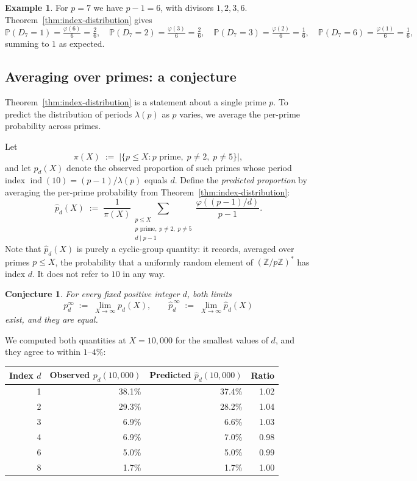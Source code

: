 \documentclass[12pt]{amsart}
\newtheorem{conjecture}[theorem]{Conjecture}
\theoremstyle{definition}
\newtheorem{example}[theorem]{Example}
\theoremstyle{remark}
\newcommand{\Z}{\mathbb{Z}}
\newcommand{\ind}{\operatorname{ind}}
\begin{document}
\begin{example}\label{ex:p-7-distribution}
For $p = 7$ we have $p - 1 = 6$, with divisors $1, 2, 3, 6$.
Theorem~\ref{thm:index-distribution} gives
\[
    \mathbb{P}(D_7 = 1) = \tfrac{\varphi(6)}{6} = \tfrac{2}{6}, \quad
    \mathbb{P}(D_7 = 2) = \tfrac{\varphi(3)}{6} = \tfrac{2}{6}, \quad
    \mathbb{P}(D_7 = 3) = \tfrac{\varphi(2)}{6} = \tfrac{1}{6}, \quad
    \mathbb{P}(D_7 = 6) = \tfrac{\varphi(1)}{6} = \tfrac{1}{6},
\]
summing to $1$ as expected.
\end{example}

\subsection{Averaging over primes: a conjecture}\label{subsec:averaging}

Theorem~\ref{thm:index-distribution} is a statement about a single prime
$p$. To predict the distribution of periods $\lambda(p)$ as $p$ varies,
we average the per-prime probability across primes.

Let
\[
    \pi(X) \;:=\; |\{p \le X : p \text{ prime},\; p \neq 2,\; p \neq 5\}|,
\]
and let $p_d(X)$ denote the observed proportion of such primes whose
period index $\ind(10) = (p-1)/\lambda(p)$ equals $d$. Define the
\emph{predicted proportion} by averaging the per-prime probability from
Theorem~\ref{thm:index-distribution}:
\[
    \widehat{p}_d(X)
    \;:=\; \frac{1}{\pi(X)}
    \sum_{\substack{p \le X \\ p \text{ prime},\; p \neq 2,\; p \neq 5 \\
    d \mid p - 1}} \frac{\varphi((p-1)/d)}{p - 1}.
\]
Note that $\widehat{p}_d(X)$ is purely a cyclic-group quantity: it
records, averaged over primes $p \le X$, the probability that a uniformly
random element of $(\Z/p\Z)^*$ has index $d$. It does not refer to $10$
in any way.

\begin{conjecture}\label{conj:agreement}
For every fixed positive integer $d$, both limits
\[
    p_d^\infty \;:=\; \lim_{X \to \infty} p_d(X), \qquad
    \widehat{p}_d^{\,\infty} \;:=\; \lim_{X \to \infty} \widehat{p}_d(X)
\]
exist, and they are equal.
\end{conjecture}

We computed both quantities at $X = 10{,}000$ for the smallest values of
$d$, and they agree to within $1$--$4\%$:

\begin{center}
\begin{tabular}{rrrr}
\hline\hline
Index $d$ & Observed $p_d(10{,}000)$ & Predicted $\widehat{p}_d(10{,}000)$
& Ratio \\
\hline
1 & 38.1\% & 37.4\% & 1.02 \\
2 & 29.3\% & 28.2\% & 1.04 \\
3 & 6.9\%  & 6.6\%  & 1.03 \\
4 & 6.9\%  & 7.0\%  & 0.98 \\
6 & 5.0\%  & 5.0\%  & 0.99 \\
8 & 1.7\%  & 1.7\%  & 1.00 \\
\hline\hline
\end{tabular}
\end{center}
\end{document}
